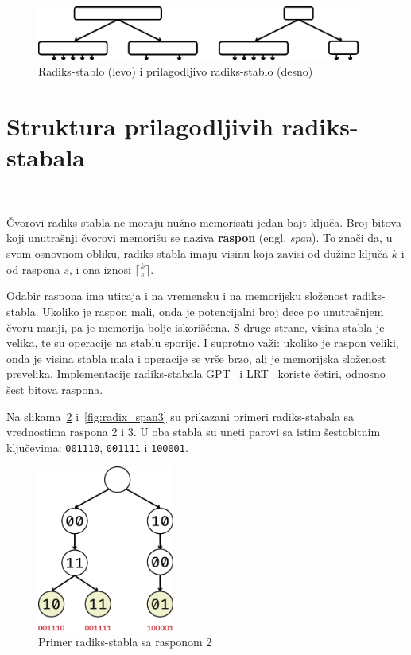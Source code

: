 \documentclass[12pt,oneside]{memoir}
\begin{document}
\hspace{10pt}
\begin{figure}[!h]
  \centering
  \includegraphics[width=0.95\textwidth]{radix_v_art.eps}
  \caption{
    Radiks-stablo (levo) i prilagodljivo radiks-stablo (desno)
  }
  \label{fig:radix_v_art}
\end{figure}

\section{Struktura prilagodljivih radiks-stabala}~\label{sec:struktura_art}

Čvorovi radiks-stabla ne moraju nužno memorisati jedan bajt ključa.
Broj bitova koji unutrašnji čvorovi memorišu se naziva \textbf{raspon} (engl. \emph{span}).
To znači da, u svom osnovnom obliku, radiks-stabla imaju visinu koja zavisi od
dužine ključa $k$ i od raspona $s$, i ona iznosi $ \lceil \frac{k}{s} \rceil $.

Odabir raspona ima uticaja i na vremensku i na memorijsku složenost
radiks-stabla. Ukoliko je raspon mali, onda je potencijalni broj dece po
unutrašnjem čvoru manji, pa je memorija bolje iskorišćena. S druge strane,
visina stabla je velika, te su operacije na stablu sporije.
I suprotno važi: ukoliko je raspon veliki,
onda je visina stabla mala i operacije se vrše brzo, ali je memorijska složenost
prevelika. Implementacije radiks-stabala GPT~\cite{gpt} i LRT~\cite{lrt}
koriste četiri, odnosno šest bitova raspona.

Na slikama~\ref{fig:radix_span2}
i~\ref{fig:radix_span3} su prikazani primeri radiks-stabala sa vrednostima
raspona 2 i 3. U oba stabla su uneti parovi sa istim šestobitnim ključevima:
\texttt{001110}, \texttt{001111} i \texttt{100001}.


\begin{figure}[!h]
  \centering
  \includegraphics[width=0.40\textwidth]{radix_span2.eps}
  \caption{Primer radiks-stabla sa rasponom 2}
  \label{fig:radix_span2}
\end{figure}
\end{document}
